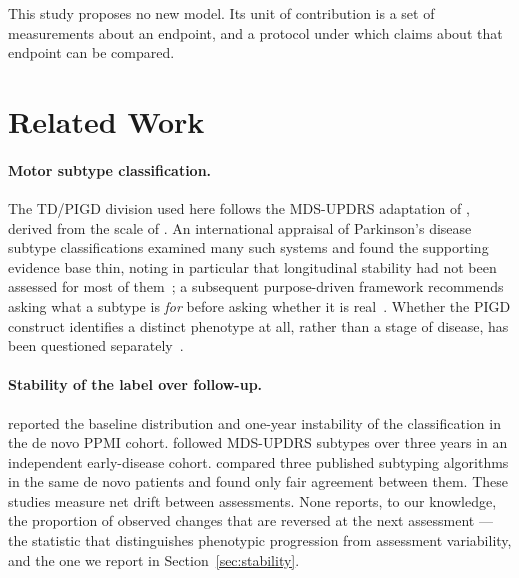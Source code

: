 \documentclass[11pt]{article}
\begin{document}
This study proposes no new model. Its unit of contribution is a set of
measurements about an endpoint, and a protocol under which claims about that
endpoint can be compared.

\section{Related Work}

\paragraph{Motor subtype classification.}
The TD/PIGD division used here follows the MDS-UPDRS adaptation of
\citet{stebbins2013}, derived from the scale of \citet{goetz2008}. An
international appraisal of Parkinson's disease subtype classifications examined
many such systems and found the supporting evidence base thin, noting in
particular that longitudinal stability had not been assessed for most of
them~\citep{mestre2021}; a subsequent purpose-driven framework recommends asking
what a subtype is \emph{for} before asking whether it is real~\citep{marras2024}.
Whether the PIGD construct identifies a distinct phenotype at all, rather than a
stage of disease, has been questioned separately~\citep{nutt2016,urso2022}.

\paragraph{Stability of the label over follow-up.}
\citet{simuni2016} reported the baseline distribution and one-year instability of
the classification in the de novo PPMI cohort. \citet{kohat2021} followed
MDS-UPDRS subtypes over three years in an independent early-disease cohort.
\citet{ren2020,ren2021} compared three published subtyping algorithms in the same
de novo patients and found only fair agreement between them. These studies
measure net drift between assessments. None reports, to our knowledge, the
proportion of observed changes that are reversed at the next assessment --- the
statistic that distinguishes phenotypic progression from assessment variability,
and the one we report in Section~\ref{sec:stability}.
\end{document}
